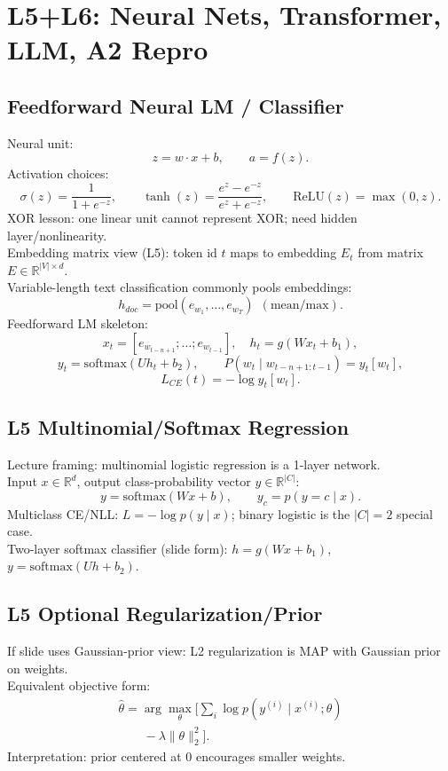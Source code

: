 \section{L5+L6: Neural Nets, Transformer, LLM, A2 Repro}
\subsection*{Feedforward Neural LM / Classifier}
Neural unit:
\[
z=w\cdot x+b,\qquad a=f(z).
\]
Activation choices:
\[
\sigma(z)=\frac{1}{1+e^{-z}},\qquad
\tanh(z)=\frac{e^z-e^{-z}}{e^z+e^{-z}},\qquad
\mathrm{ReLU}(z)=\max(0,z).
\]
XOR lesson: one linear unit cannot represent XOR; need hidden layer/nonlinearity.\\
Embedding matrix view (L5): token id $t$ maps to embedding $E_t$ from matrix $E\in\mathbb R^{|V|\times d}$.\\
Variable-length text classification commonly pools embeddings:
\[
h_{doc}=\mathrm{pool}(e_{w_1},\ldots,e_{w_T})\ \ (\text{mean/max}).
\]
Feedforward LM skeleton:
\[
x_t=[e_{w_{t-n+1}};\ldots;e_{w_{t-1}}],
\quad
h_t=g(Wx_t+b_1),
\]
\[
y_t=\mathrm{softmax}(Uh_t+b_2),\qquad
P(w_t\mid w_{t-n+1:t-1})=y_t[w_t],
\]
\[
L_{CE}(t)=-\log y_t[w_t].
\]

\subsection*{L5 Multinomial/Softmax Regression}
Lecture framing: multinomial logistic regression is a 1-layer network.\\
Input $x\in\mathbb R^d$, output class-probability vector $y\in\mathbb R^{|C|}$:
\[
y=\mathrm{softmax}(Wx+b),\qquad y_c=p(y=c\mid x).
\]
Multiclass CE/NLL: $L=-\log p(y\mid x)$; binary logistic is the $|C|=2$ special case.\\
Two-layer softmax classifier (slide form): $h=g(Wx+b_1)$, $y=\mathrm{softmax}(Uh+b_2)$.

\subsection*{L5 Optional Regularization/Prior}
If slide uses Gaussian-prior view: L2 regularization is MAP with Gaussian prior on weights.\\
Equivalent objective form:
\[
\begin{array}{l}
\hat\theta=\arg\max_\theta\Big[
\sum_i \log p(y^{(i)}\mid x^{(i)};\theta)\\
\qquad -\lambda\|\theta\|_2^2
\Big].
\end{array}
\]
Interpretation: prior centered at $0$ encourages smaller weights.

